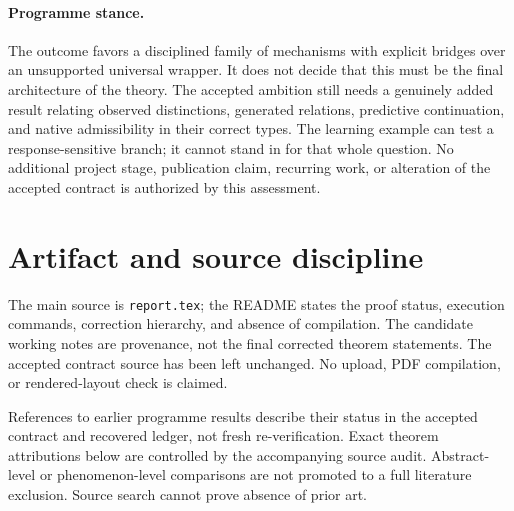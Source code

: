 \documentclass[11pt]{article}
\theoremstyle{remark}
\begin{document}
\paragraph{Programme stance.}
The outcome favors a disciplined family of mechanisms with explicit bridges over an unsupported universal wrapper. It does not decide that this must be the final architecture of the theory. The accepted ambition still needs a genuinely added result relating observed distinctions, generated relations, predictive continuation, and native admissibility in their correct types. The learning example can test a response-sensitive branch; it cannot stand in for that whole question. No additional project stage, publication claim, recurring work, or alteration of the accepted contract is authorized by this assessment.

\appendix
\section{Artifact and source discipline}

The main source is \texttt{report.tex}; the README states the proof status, execution commands, correction hierarchy, and absence of compilation. The candidate working notes are provenance, not the final corrected theorem statements. The accepted contract source has been left unchanged. No upload, PDF compilation, or rendered-layout check is claimed.

References to earlier programme results describe their status in the accepted contract and recovered ledger, not fresh re-verification. Exact theorem attributions below are controlled by the accompanying source audit. Abstract-level or phenomenon-level comparisons are not promoted to a full literature exclusion. Source search cannot prove absence of prior art.
\end{document}
